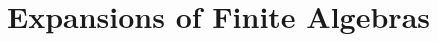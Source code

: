 \documentclass[cm,dissertation]{uhthesis}
\theoremstyle{plain}
\theoremstyle{definition}
\theoremstyle{remark}
\numberwithin{theorem}{section}
\numberwithin{claim}{chapter}
\numberwithin{equation}{section}
\numberwithin{conjecture}{chapter}
\newcommand{\<}{\ensuremath{\langle}}
\renewcommand{\>}{\ensuremath{\rangle}}
\newcommand{\FLRP}{{\small FLRP}}
\newcommand{\0}{\ensuremath{\mathbf{0}}}
\newcommand{\1}{\ensuremath{\mathbf{1}}}
\newcommand{\2}{\ensuremath{\mathbf{2}}}
\newcommand{\3}{\ensuremath{\mathbf{3}}}
\newcommand{\4}{\ensuremath{\mathbf{4}}}
\newcommand{\5}{\ensuremath{\mathbf{5}}}
\begin{document}



\chapter{Expansions of Finite Algebras}
\label{cha:expans-finite-algebr}
\end{document}
